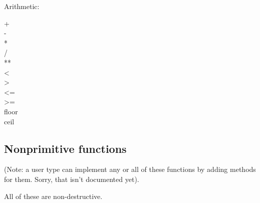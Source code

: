 \documentclass[11pt]{article}
\begin{document}
Arithmetic:
\begin{description}
\item[{+}] 

\item[{-}] 

\item[{*}] 

\item[{/}] 

\item[{**}] 

\item[{<}] 

\item[{>}] 

\item[{<=}] 

\item[{>=}] 

\item[{floor}] 

\item[{ceil}] 
\end{description}

\subsection{Nonprimitive functions}
\label{sec:orgf3599f1}

(Note: a user type can implement any or all of these functions by adding methods
for them. Sorry, that isn't documented yet).

All of these are non-destructive.
\end{document}
